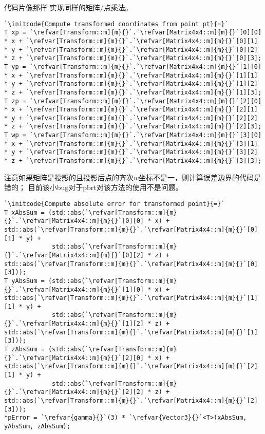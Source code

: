 代码片像那样
实现同样的矩阵/点乘法。
\begin{lstlisting}
`\initcode{Compute transformed coordinates from point pt}{=}`
T xp = `\refvar[Transform::m]{m}{}`.`\refvar[Matrix4x4::m]{m}{}`[0][0] * x + `\refvar[Transform::m]{m}{}`.`\refvar[Matrix4x4::m]{m}{}`[0][1] * y + `\refvar[Transform::m]{m}{}`.`\refvar[Matrix4x4::m]{m}{}`[0][2] * z + `\refvar[Transform::m]{m}{}`.`\refvar[Matrix4x4::m]{m}{}`[0][3];
T yp = `\refvar[Transform::m]{m}{}`.`\refvar[Matrix4x4::m]{m}{}`[1][0] * x + `\refvar[Transform::m]{m}{}`.`\refvar[Matrix4x4::m]{m}{}`[1][1] * y + `\refvar[Transform::m]{m}{}`.`\refvar[Matrix4x4::m]{m}{}`[1][2] * z + `\refvar[Transform::m]{m}{}`.`\refvar[Matrix4x4::m]{m}{}`[1][3];
T zp = `\refvar[Transform::m]{m}{}`.`\refvar[Matrix4x4::m]{m}{}`[2][0] * x + `\refvar[Transform::m]{m}{}`.`\refvar[Matrix4x4::m]{m}{}`[2][1] * y + `\refvar[Transform::m]{m}{}`.`\refvar[Matrix4x4::m]{m}{}`[2][2] * z + `\refvar[Transform::m]{m}{}`.`\refvar[Matrix4x4::m]{m}{}`[2][3];
T wp = `\refvar[Transform::m]{m}{}`.`\refvar[Matrix4x4::m]{m}{}`[3][0] * x + `\refvar[Transform::m]{m}{}`.`\refvar[Matrix4x4::m]{m}{}`[3][1] * y + `\refvar[Transform::m]{m}{}`.`\refvar[Matrix4x4::m]{m}{}`[3][2] * z + `\refvar[Transform::m]{m}{}`.`\refvar[Matrix4x4::m]{m}{}`[3][3];
\end{lstlisting}

注意如果矩阵是投影的且投影后点的齐次$w$坐标不是一，则计算误差边界的代码是错的；
目前该小bug对于pbrt对该方法的使用不是问题。
\begin{lstlisting}
`\initcode{Compute absolute error for transformed point}{=}`
T xAbsSum = (std::abs(`\refvar[Transform::m]{m}{}`.`\refvar[Matrix4x4::m]{m}{}`[0][0] * x) + std::abs(`\refvar[Transform::m]{m}{}`.`\refvar[Matrix4x4::m]{m}{}`[0][1] * y) +
             std::abs(`\refvar[Transform::m]{m}{}`.`\refvar[Matrix4x4::m]{m}{}`[0][2] * z) + std::abs(`\refvar[Transform::m]{m}{}`.`\refvar[Matrix4x4::m]{m}{}`[0][3]));
T yAbsSum = (std::abs(`\refvar[Transform::m]{m}{}`.`\refvar[Matrix4x4::m]{m}{}`[1][0] * x) + std::abs(`\refvar[Transform::m]{m}{}`.`\refvar[Matrix4x4::m]{m}{}`[1][1] * y) +
             std::abs(`\refvar[Transform::m]{m}{}`.`\refvar[Matrix4x4::m]{m}{}`[1][2] * z) + std::abs(`\refvar[Transform::m]{m}{}`.`\refvar[Matrix4x4::m]{m}{}`[1][3]));
T zAbsSum = (std::abs(`\refvar[Transform::m]{m}{}`.`\refvar[Matrix4x4::m]{m}{}`[2][0] * x) + std::abs(`\refvar[Transform::m]{m}{}`.`\refvar[Matrix4x4::m]{m}{}`[2][1] * y) +
             std::abs(`\refvar[Transform::m]{m}{}`.`\refvar[Matrix4x4::m]{m}{}`[2][2] * z) + std::abs(`\refvar[Transform::m]{m}{}`.`\refvar[Matrix4x4::m]{m}{}`[2][3]));
*pError = `\refvar{gamma}{}`(3) * `\refvar{Vector3}{}`<T>(xAbsSum, yAbsSum, zAbsSum);
\end{lstlisting}

